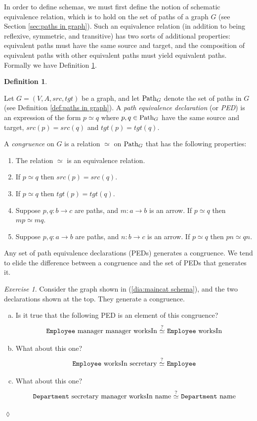 \documentclass{book}
\def\tn{\textnormal}
\def\Path{\tn{Path}}
\def\to{\rightarrow}
\def\taking{\colon}
\theoremstyle{remark}
\newtheorem{exc}[subsubsection]{Exercise}
\newenvironment{exercise}{\begin{exc}}{\hspace*{\fill}$\lozenge$\end{exc}}
\theoremstyle{definition}
\newtheorem{definition}[subsubsection]{Definition}
\def\sexc{\begin{enumerate}[a.)]\setlength{\itemsep}{.1cm}\setlength{\parskip}{.1cm}\item}
\def\next{\item}
\def\endsexc{\end{enumerate}}
\begin{document}
In order to define schemas, we must first define the notion of schematic equivalence relation, which is to hold on the set of paths of a graph $G$ (see Section \ref{sec:paths in graph}). Such an equivalence relation (in addition to being reflexive, symmetric, and transitive) has two sorts of additional properties: equivalent paths must have the same source and target, and the composition of equivalent paths with other equivalent paths must yield equivalent paths. Formally we have Definition \ref{def:congruence}.

\begin{definition}\label{def:congruence}\

Let $G=(V,A,src,tgt)$ be a graph, and let $\Path_G$ denote the set of paths in $G$ (see Definition \ref{def:paths in graph}). A {\em path equivalence declaration} (or {\em PED}) is an expression of the form $p\simeq q$ where $p,q\in\Path_G$ have the same source and target, $src(p)=src(q)$ and $tgt(p)=tgt(q)$. 

A {\em congruence} on $G$ is a relation $\simeq$ on $\Path_G$ that has the following properties: 
\begin{enumerate}
\item The relation $\simeq$ is an equivalence relation.
\item If $p\simeq q$ then $src(p)=src(q)$.
\item If $p\simeq q$ then $tgt(p)=tgt(q)$.
\item Suppose $p,q\taking b\to c$ are paths, and $m\taking a\to b$ is an arrow. If $p\simeq q$ then $mp\simeq mq$. 
\item Suppose $p,q\taking a\to b$ are paths, and $n\taking b\to c$ is an arrow. If $p\simeq q$ then $pn\simeq qn$.
\end{enumerate}

\end{definition}

Any set of path equivalence declarations (PEDs) generates a congruence. We tend to elide the difference between a congruence and the set of PEDs that generates it.

\begin{exercise}\label{exc:generating congruence}
Consider the graph shown in (\ref{dia:maincat schema}), and the two declarations shown at the top. They generate a congruence. 
\sexc Is it true that the following PED is an element of this congruence? $$\tn{{\tt Employee} manager manager worksIn $\stackrel{?}{\simeq}$ {\tt Employee} worksIn}$$ \next What about this one? $$\tn{{\tt Employee} worksIn secretary $\stackrel{?}{\simeq}$ {\tt Employee}}$$ 
\next What about this one? $$\tn{{\tt Department} secretary manager worksIn name $\stackrel{?}{\simeq}$ {\tt Department} name}$$
\endsexc
\end{exercise}
\end{document}
